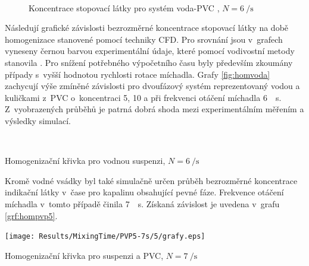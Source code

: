 \begin{figure}[h!]
 \centering

  \qquad             
  \\
  \qquad
  \caption{Koncentrace stopovací látky pro systém voda-PVC , $N=\SI{6}{\per\second}$}
  \label{fig:t}
\end{figure}

Následují grafické závislosti bezrozměrné koncentrace stopovací látky na době homogenizace stanovené pomocí techniky CFD. Pro srovnání jsou v~grafech vyneseny černou barvou experimentální údaje, které pomocí vodivostní metody stanovila \citet{pav11}. Pro snížení potřebného výpočetního času byly především zkoumány případy s~vyšší hodnotou rychlosti rotace míchadla. Grafy \ref{fig:homvoda} zachycují výše zmíněné závislosti pro dvoufázový systém reprezentovaný vodou a kuličkami z~PVC o~koncentraci 5, 10 a  při frekvenci otáčení míchadla \SI{6}{\per\second}. Z~vyobrazených průběhů je patrná dobrá shoda mezi experimentálním měřením a výsledky simulací.

\begin{grf}[h!]
 \centering
  \\ 
\end{grf}
\newpage

\begin{grf}[t!]
  \addtocounter{subgrf}{2}
  \centering
  \caption{Homogenizační křivka pro vodnou suspenzi, $N=\SI{6}{\per\second}$}
  \label{fig:homvoda}
\end{grf}
\noindent Kromě vodné vsádky byl také simulačně určen průběh bezrozměrné koncentrace indikační látky v~čase pro kapalinu \pvpP{} obsahující  pevné fáze. Frekvence otáčení míchadla v~tomto případě činila \SI{7}{\per\second}. Získaná závislost je uvedena v~grafu \ref{grf:hompvp5}.
\begin{grf}[h!]
 \centering 
  \texttt{[image: Results/MixingTime/PVP5-7s/5/grafy.eps]}
  \caption{Homogenizační křivka pro suspenzi \pvpP{} a  PVC, $N=\SI{7}{\per\second}$}
  \label{grf:hompvp5}
\end{grf}
\newpage

